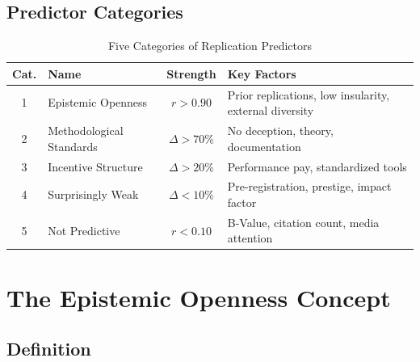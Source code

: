 \documentclass[11pt,a4paper]{article}
\begin{document}
\subsection{Predictor Categories}

\begin{table}[h]
\centering
\caption{Five Categories of Replication Predictors}
\label{tab:categories}
\begin{tabular}{clcp{5cm}}
\toprule
\textbf{Cat.} & \textbf{Name} & \textbf{Strength} & \textbf{Key Factors} \\
\midrule
1 & Epistemic Openness & $r > 0.90$ & Prior replications, low insularity, external diversity \\
2 & Methodological Standards & $\Delta > 70\%$ & No deception, theory, documentation \\
3 & Incentive Structure & $\Delta > 20\%$ & Performance pay, standardized tools \\
4 & Surprisingly Weak & $\Delta < 10\%$ & Pre-registration, prestige, impact factor \\
5 & Not Predictive & $r < 0.10$ & B-Value, citation count, media attention \\
\bottomrule
\end{tabular}
\end{table}


\section{The Epistemic Openness Concept}
\label{sec:concept}

\subsection{Definition}
\end{document}
